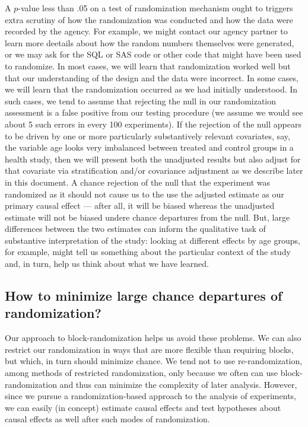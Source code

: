 \documentclass[
  12pt,
]{book}
\theoremstyle{definition}
\theoremstyle{definition}
\theoremstyle{definition}
\theoremstyle{remark}
\begin{document}
A \(p\)-value less than .05 on a test of randomization mechanism ought
to triggers extra scrutiny of how the randomization was conducted and
how the data were recorded by the agency. For example, we might contact
our agency partner to learn more deetails about how the random numbers
themselves were generated, or we may ask for the SQL or SAS code or
other code that might have been used to randomize. In most cases, we
will learn that randomization worked well but that our understanding of
the design and the data were incorrect. In some cases, we will learn
that the randomization occurred as we had initially understood. In such
cases, we tend to assume that rejecting the null in our randomization
assessment is a false positive from our testing procedure (we assume we
would see about 5 such errors in every 100 experiments). If the
rejection of the null appears to be driven by one or more particularly
substantively relevant covariates, say, the variable age looks very
imbalanced between treated and control groups in a health study, then we
will present both the unadjusted results but also adjust for that
covariate via stratification and/or covariance adjustment as we describe
later in this document. A chance rejection of the null that the
experiment was randomized as it should not cause us to the use the
adjusted estimate as our primary causal effect --- after all, it will be
biased whereas the unadjusted estimate will not be biased undere chance
departures from the null. But, large differences between the two
estimates can inform the qualitative task of substantive interpretation
of the study: looking at different effects by age groups, for example,
might tell us something about the particular context of the study and,
in turn, help us think about what we have learned.

\hypertarget{how-to-minimize-large-chance-departures-of-randomization}{%
\subsection{How to minimize large chance departures of
randomization?}\label{how-to-minimize-large-chance-departures-of-randomization}}

Our approach to block-randomization helps us avoid these problems. We
can also restrict our randomization in ways that are more flexible than
requiring blocks, but which, in turn should minimize chance. We tend not
to use re-randomization, among methods of restricted randomization, only
because we often can use block-randomization and thus can minimize the
complexity of later analysis. However, since we pursue a
randomization-based approach to the analysis of experiments, we can
easily (in concept) estimate causal effects and test hypotheses about
causal effects as well after such modes of randomization.
\end{document}

